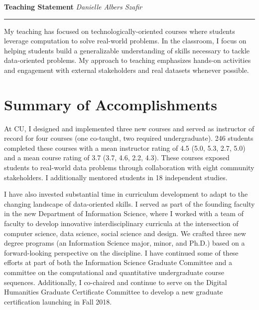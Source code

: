 \documentclass[11pt]{article}
\begin{document}
\setlength{\belowcaptionskip}{-10pt}

\thispagestyle{fancy}

\textbf{\Large Teaching Statement}
{\hspace{220pt}\emph{Danielle Albers Szafir} \vspace{3pt}}
\hrule

My teaching has focused on technologically-oriented courses where students leverage computation to solve real-world problems. In the classroom, I focus on helping students build a generalizable understanding of skills necessary to tackle data-oriented problems. My approach to teaching emphasizes hands-on activities and engagement with external stakeholders and real datasets whenever possible. 

\section*{Summary of Accomplishments}

At CU, I designed and implemented three new courses and served as instructor of record for four courses (one co-taught, two required undergraduate). 246 students completed these courses with a mean instructor rating of 4.5 (5.0, 5.3, 2.7, 5.0) and a mean course rating of 3.7 (3.7, 4.6, 2.2, 4.3). These courses exposed students to real-world data problems through collaboration with eight community stakeholders. I additionally mentored students in 18 independent studies. 

I have also invested substantial time in curriculum development to adapt to the changing landscape of data-oriented skills. I served as part of the founding faculty in the new Department of Information Science, where I worked with a team of faculty to develop innovative interdisciplinary curricula at the intersection of computer science, data science, social science and design. We crafted three new degree programs (an Information Science major, minor, and Ph.D.) based on a forward-looking perspective on the discipline. I have continued some of these efforts at part of both the Information Science Graduate Committee and a committee on the computational and quantitative undergraduate course sequences. Additionally, I co-chaired and continue to serve on the Digital Humanities Graduate Certificate Committee to develop a new graduate certification launching in Fall 2018. 
\end{document}
